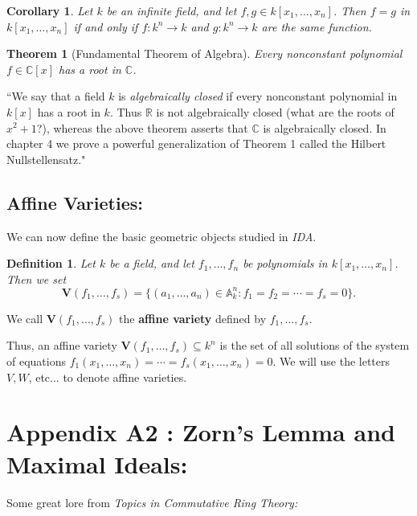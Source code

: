 \documentclass[12pt,reqno]{amsart}
\theoremstyle{plain}
\newtheorem{defi}{Definition}
\newtheorem{theorem}{Theorem}
\newtheorem{coro}{Corollary}
\newcommand{\aff}{\mathbb A}
\newcommand{\pring}{k[x_1, \ldots , x_n]}
\newcommand{\rr}{\mathbb R}
\newcommand{\cc}{\mathbb C}
\newcommand{\V}{\mathbf V}
\begin{document}
\begin{coro} Let $k$ be an infinite field, and let $f, g \in  \pring $. Then $f = g$ in $\pring$ if and only if $f \colon k^n \to k$ and $g \colon k^n \to k$ are the same function.
\end{coro} 

\begin{theorem}[Fundamental Theorem of Algebra] Every nonconstant polynomial $f \in \cc[x]$ has a root in $\cc$.
\end{theorem}

``We say that a field $k$ is \textit{algebraically closed} if every nonconstant polynomial in $k[x]$ has a root in $k$. Thus $\rr$ is not algebraically closed (what are the roots of $x^2 + 1 $?), whereas the above theorem asserts that $\cc$ is algebraically closed. In chapter 4 we prove a powerful generalization of Theorem 1 called the Hilbert Nullstellensatz."

\subsection{Affine Varieties:} 

We can now define the basic geometric objects studied in \textit{IDA}.

\begin{defi} Let $k$ be a field, and let $f_1, \ldots, f_n$ be polynomials in $\pring$. Then we set $$\V (f_1, \ldots , f_s) = \{ (a_1, \ldots, a_n) \in \aff^n_k \colon f_1 = f_2 = \cdots = f_s = 0 \}.$$
\end{defi} 
We call $\V (f_1, \ldots, f_s)$ the \textbf{affine variety} defined by $f_1, \ldots, f_s$.

Thus, an affine variety $\V (f_1, \ldots, f_s) \subseteq k^n $ is the set of all solutions of the system of equations $f_1 (x_1, \ldots, x_n) = \cdots = f_s (x_1, \ldots, x_n ) = 0$. We will use the letters $V, W$, etc... to denote affine varieties.
\newpage
\section{Appendix A2 : Zorn’s Lemma and Maximal Ideals:}

Some great lore from \textit{Topics in Commutative Ring Theory:}
\end{document}
